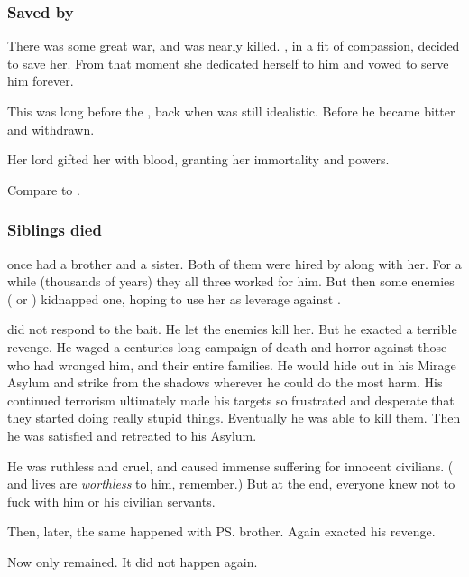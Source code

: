 \subsubsection{Saved by \Ishnaruchaefir}
There was some great war, and \Criseis{} was nearly killed. 
\Ishnaruchaefir, in a fit of compassion, decided to save her. 
From that moment she dedicated herself to him and vowed to serve him forever. 

This was long before the \secondbanewar, back when \Ishnaruchaefir{} was still idealistic. 
Before he became bitter and withdrawn. 

Her lord gifted her with \xzaishannic{} blood, granting her immortality and \daemonic{} powers. 

Compare to . 





\subsubsection{Siblings died}
\Criseis{} once had a brother and a sister. 
Both of them were hired by \Ishnaruchaefir{} along with her. 
For a while (thousands of years) they all three worked for him. 
But then some enemies (\resphain{} or \dragons) kidnapped one, hoping to use her as leverage against \Ishnaruchaefir. 

\Ishnaruchaefir{} did not respond to the bait. 
He let the enemies kill her. 
But he exacted a terrible revenge. 
He waged a centuries-long campaign of death and horror against those who had wronged him, and their entire families. 
He would hide out in his Mirage Asylum and strike from the shadows wherever he could do the most harm. 
His continued terrorism ultimately made his targets so frustrated and desperate that they started doing really stupid things. 
Eventually he was able to kill them. 
Then he was satisfied and retreated to his Asylum. 

He was ruthless and cruel, and caused immense suffering for innocent civilians. 
(\Resphan{} and \human{} lives are \emph{worthless} to him, remember.) 
But at the end, everyone knew not to fuck with him or his civilian servants. 

Then, later, the same happened with \ps{\Criseis} brother. 
Again \Ishnaruchaefir{} exacted his revenge. 

Now only \Criseis{} remained. 
It did not happen again. 










